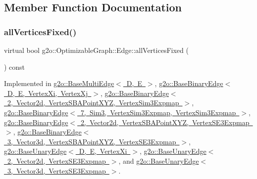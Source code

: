 \subsection{Member Function Documentation}
\mbox{\label{classg2o_1_1_optimizable_graph_1_1_edge_a414c69ca1617a4d3b620e39f2ffbcea7}} 
\subsubsection{\texorpdfstring{all\+Vertices\+Fixed()}{allVerticesFixed()}}
{\footnotesize\ttfamily virtual bool g2o\+::\+Optimizable\+Graph\+::\+Edge\+::all\+Vertices\+Fixed (\begin{DoxyParamCaption}{ }\end{DoxyParamCaption}) const\hspace{0.3cm}{\ttfamily [pure virtual]}}



Implemented in \mbox{\hyperlink{classg2o_1_1_base_multi_edge_a6e665877bd472839872077f5cc1ff2ec}{g2o\+::\+Base\+Multi\+Edge$<$ D, E $>$}}, \mbox{\hyperlink{classg2o_1_1_base_binary_edge_adc9ce883a63aa7bdba86e552d72e1de9}{g2o\+::\+Base\+Binary\+Edge$<$ D, E, Vertex\+Xi, Vertex\+Xj $>$}}, \mbox{\hyperlink{classg2o_1_1_base_binary_edge_adc9ce883a63aa7bdba86e552d72e1de9}{g2o\+::\+Base\+Binary\+Edge$<$ 2, Vector2d, Vertex\+S\+B\+A\+Point\+X\+Y\+Z, Vertex\+Sim3\+Expmap $>$}}, \mbox{\hyperlink{classg2o_1_1_base_binary_edge_adc9ce883a63aa7bdba86e552d72e1de9}{g2o\+::\+Base\+Binary\+Edge$<$ 7, Sim3, Vertex\+Sim3\+Expmap, Vertex\+Sim3\+Expmap $>$}}, \mbox{\hyperlink{classg2o_1_1_base_binary_edge_adc9ce883a63aa7bdba86e552d72e1de9}{g2o\+::\+Base\+Binary\+Edge$<$ 2, Vector2d, Vertex\+S\+B\+A\+Point\+X\+Y\+Z, Vertex\+S\+E3\+Expmap $>$}}, \mbox{\hyperlink{classg2o_1_1_base_binary_edge_adc9ce883a63aa7bdba86e552d72e1de9}{g2o\+::\+Base\+Binary\+Edge$<$ 3, Vector3d, Vertex\+S\+B\+A\+Point\+X\+Y\+Z, Vertex\+S\+E3\+Expmap $>$}}, \mbox{\hyperlink{classg2o_1_1_base_unary_edge_a4c5ec31144a266fb059b73b2387456c1}{g2o\+::\+Base\+Unary\+Edge$<$ D, E, Vertex\+Xi $>$}}, \mbox{\hyperlink{classg2o_1_1_base_unary_edge_a4c5ec31144a266fb059b73b2387456c1}{g2o\+::\+Base\+Unary\+Edge$<$ 2, Vector2d, Vertex\+S\+E3\+Expmap $>$}}, and \mbox{\hyperlink{classg2o_1_1_base_unary_edge_a4c5ec31144a266fb059b73b2387456c1}{g2o\+::\+Base\+Unary\+Edge$<$ 3, Vector3d, Vertex\+S\+E3\+Expmap $>$}}.

